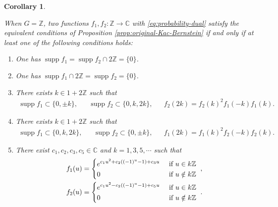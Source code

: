 \documentclass[12pt]{article}
\newtheorem{corollary}[theorem]{Corollary}
\theoremstyle{definition}
\theoremstyle{remark}
\numberwithin{equation}{section}
\numberwithin{figure}{section}
\numberwithin{table}{section}
\DeclareMathOperator{\supp}{supp}
\begin{document}
\begin{corollary}
    \label{cor:original-Kac-Bernstein-Z}

When $ G = \mathbb{ Z } $, two functions $ f_1 , f_2 \colon \mathbb{ Z } \to \mathbb{ C } $ with \eqref{eq:probability-dual} satisfy the equivalent conditions of Proposition \ref{prop:original-Kac-Bernstein} if and only if at least one of the following conditions holds:

\begin{enumerate}

\item \label{item:original-Kac-Bernstein-Z-f1-one-point}

One has $ \supp f_1 = \supp f_2 \cap 2 \mathbb{ Z } = \{ 0 \} $.

\item \label{item:original-Kac-Bernstein-Z-f2-one-point}

One has $ \supp f_1 \cap 2 \mathbb{ Z } = \supp f_2 = \{ 0 \} $.

\item \label{item:original-Kac-Bernstein-Z-six-point-f1-symmetry}

There exists $ k  \in 1 + 2 \mathbb{ Z } $ such that
\begin{align}
    \supp f_1 \subset \{ 0 , \pm k \}, & &
    \supp f_2 \subset \{ 0 , k , 2 k \}, & &
    f_2 ( 2 k ) = f_2 ( k )^2 f_1 ( - k ) f_1 ( k ).
\end{align}

\item \label{item:original-Kac-Bernstein-Z-six-point-f2-symmetry}

There exists $ k  \in 1 + 2 \mathbb{ Z } $ such that
\begin{align}
    \supp f_1 \subset \{ 0 , k , 2 k \}, & &
    \supp f_2 \subset \{ 0 , \pm k \}, & &
    f_1 ( 2 k ) = f_1 ( k )^2 f_2 ( - k ) f_2 ( k ).
\end{align}

\item \label{item:original-Kac-Bernstein-Z-Gauss}

There exist $c_1 , c_2 , c_3 , c_5 \in \mathbb{ C } $ and $ k = 1 , 3 , 5 , \cdots $ such that
\begin{align}
  f_1 ( u )
  & =
  \left\{
  \begin{aligned}
    & e^{ c_1 u^2 + c_2 ( ( - 1 )^u - 1 ) + c_3 u } & & \text{ if $ u \in k \mathbb{ Z } $} \\
    & 0 & & \text{ if $ u \notin k \mathbb{ Z } $ }
  \end{aligned}
  \right. , \\
  f_2 ( u )
  & =
  \left\{
  \begin{aligned}
    & e^{ c_1 u^2 - c_2 ( ( - 1 )^u - 1 ) + c_5 u } & & \text{ if $ u \in k \mathbb{ Z } $} \\
    & 0 & & \text{ if $ u \notin k \mathbb{ Z } $ }
  \end{aligned}
  \right. . \label{eq:original-Kac-Bernstein-Z-Gauss-represent}
\end{align}

\end{enumerate}
    
\end{corollary}
\end{document}
